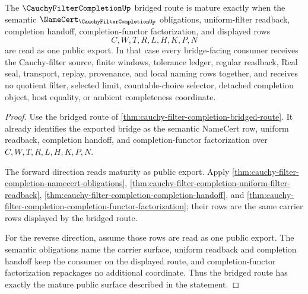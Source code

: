 \begin{theorem}
\label{thm:cauchy-filter-completion-bridged-route-maturity}
The $\CauchyFilterCompletionUp$ bridged route is mature exactly when the semantic $\NameCert_{\CauchyFilterCompletionUp}$ obligations, uniform-filter readback, completion handoff, completion-functor factorization, and displayed rows
$$
C,W,T,R,L,H,K,P,N
$$
are read as one public export. In that case every bridge-facing consumer receives the Cauchy-filter source, finite windows, tolerance ledger, regular readback, Real seal, transport, replay, provenance, and local naming rows together, and receives no quotient filter, selected limit, countable-choice selector, detached completion object, host equality, or ambient completeness coordinate.
\end{theorem}
\begin{proof}
Use the bridged route of \autoref{thm:cauchy-filter-completion-bridged-route}. It already identifies the exported bridge as the semantic NameCert row, uniform readback, completion handoff, and completion-functor factorization over $C,W,T,R,L,H,K,P,N$.

The forward direction reads maturity as public export. Apply \autoref{thm:cauchy-filter-completion-namecert-obligations}, \autoref{thm:cauchy-filter-completion-uniform-filter-readback}, \autoref{thm:cauchy-filter-completion-completion-handoff}, and \autoref{thm:cauchy-filter-completion-completion-functor-factorization}; their rows are the same carrier rows displayed by the bridged route.

For the reverse direction, assume those rows are read as one public export. The semantic obligations name the carrier surface, uniform readback and completion handoff keep the consumer on the displayed route, and completion-functor factorization repackages no additional coordinate. Thus the bridged route has exactly the mature public surface described in the statement.
\end{proof}
